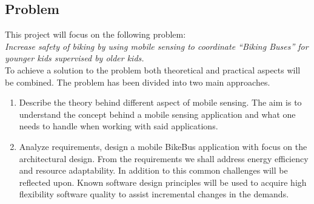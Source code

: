\subsection{Problem}


            
    
    
This project will focus on the following problem:\\

\textit{Increase safety of biking by using mobile sensing to coordinate “Biking Buses” for younger kids supervised by older kids.}\\


To achieve a solution to the problem both theoretical and practical aspects will be combined. The problem has been divided into two main approaches. 


\begin{enumerate}
    \item   Describe the theory behind different aspect of mobile sensing. The aim is to understand the concept behind a mobile sensing application and what one needs to handle when working with said applications. 
            
    \item  Analyze requirements, design a mobile BikeBus application with focus on the architectural design. From the requirements we shall address energy efficiency and resource adaptability. In addition to this common challenges will be reflected upon. Known software design principles will be used to acquire high flexibility software quality to assist incremental changes in the demands. 

\end{enumerate}


